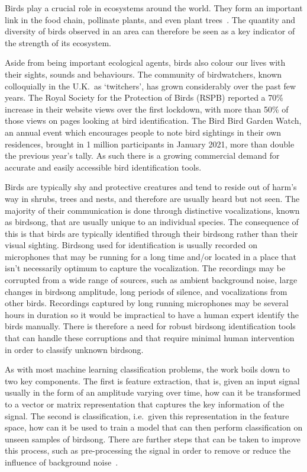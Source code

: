 Birds play a crucial role in ecosystems around the world. They form an important
link in the food chain, pollinate plants, and even plant
trees~\cite{broughton2021long}. The quantity and diversity of birds observed in
an area can therefore be seen as a key indicator of the strength of its
ecosystem.

Aside from being important ecological agents, birds also colour our lives with
their sights, sounds and behaviours. The community of birdwatchers, known
colloquially in the U.K.~as `twitchers', has grown considerably over the past
few years. The Royal Society for the Protection of Birds (RSPB) reported a 70\%
increase in their website views over the first lockdown, with more than 50\% of
those views on pages looking at bird identification. The Bird Bird Garden Watch,
an annual event which encourages people to note bird sightings in their own
residences, brought in 1 million participants in January 2021, more than double
the previous year's tally. As such there is a growing commercial demand for
accurate and easily accessible bird identification tools.

Birds are typically shy and protective creatures and tend to reside out of
harm's way in shrubs, trees and nests, and therefore are usually heard but not
seen. The majority of their communication is done through distinctive
vocalizations, known as birdsong, that are usually unique to an individual
species. The consequence of this is that birds are typically identified through
their birdsong rather than their visual sighting. Birdsong used for
identification is usually recorded on microphones that may be running for a long
time and/or located in a place that isn't necessarily optimum to capture the
vocalization. The recordings may be corrupted from a wide range of sources, such
as ambient background noise, large changes in birdsong amplitude, long periods
of silence, and vocalizations from other birds. Recordings captured by long
running microphones may be several hours in duration so it would be impractical
to have a human expert identify the birds manually. There is therefore a need
for robust birdsong identification tools that can handle these corruptions and
that require minimal human intervention in order to classify unknown birdsong.

As with most machine learning classification problems, the work boils down to
two key components. The first is feature extraction, that is, given an input
signal usually in the form of an amplitude varying over time, how can it be
transformed to a vector or matrix representation that captures the key
information of the signal. The second is classification, i.e.~given this
representation in the feature space, how can it be used to train a model that
can then perform classification on unseen samples of birdsong. There are further
steps that can be taken to improve this process, such as pre-processing the
signal in order to remove or reduce the influence of background
noise~\cite{potamitis2014automatic}.

